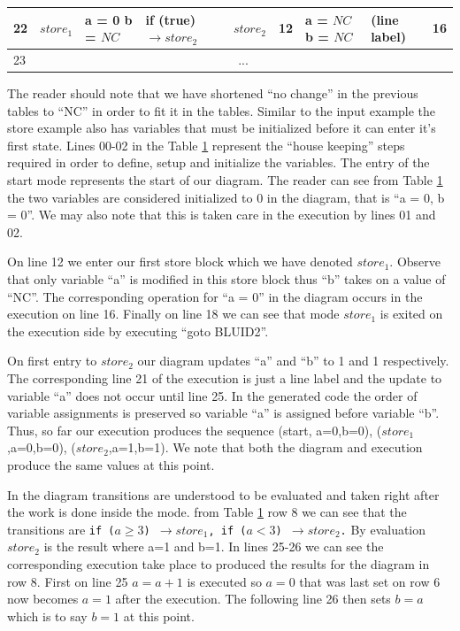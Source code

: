 \begin{table}[htcb]
\begin{tabular}{|p{} | p{} | p{} | p{} | p{} | p{} | p{} | p{} | p{} |}
			\hline
			22&$store_1$			&	a = 0 \newline b = $NC$		&	if (true) $\rightarrow store_2$ & $store_2$			&	12					&	a = $NC$ \newline b = $NC$	&	(line label)				&	16	\\
			\hline
			23&\multicolumn{8}{|c|}{...}\\
			\hline
		\end{tabular}
	\label{table:StoreExecCombined}
\end{table}

The reader should note that we have shortened ``no change'' in the previous tables to ``NC'' in order to fit
it in the tables.  Similar to the input example the store example also has variables that must be initialized 
before it can enter it's first state. Lines 00-02 in the Table \ref{table:StoreExecCombined} represent the 
``house keeping'' steps required in order to define, setup and initialize the variables. The entry of the start
mode represents the start of our diagram. The reader can see from Table \ref{table:StoreExecCombined} the two
variables are considered initialized to 0 in the diagram, that is ``a = 0, b = 0''. We may also note that this
is taken care in the execution by lines 01 and 02.

On line 12 we enter our first store block which we
have denoted $store_1$. Observe that only variable ``a'' is modified in this store block thus ``b'' takes on 
a value of ``NC''. The corresponding operation for ``a = 0'' in the diagram occurs in the execution on line 16.
Finally on line 18 we can see that mode $store_1$ is exited on the execution side by executing ``goto BLUID2''.

On first entry to $store_2$ our diagram updates ``a'' and ``b'' to 1 and 1 respectively. The corresponding line 21 of
the execution is just a line label and the update to variable ``a'' does not occur until line 25. In the generated
code the order of variable assignments is preserved so variable ``a'' is assigned before variable ``b''. Thus, so
far our execution produces the sequence (start, {a=0,b=0}), ($store_1$,{a=0,b=0}), ($store_2$,{a=1,b=1}). We note that
both the diagram and execution produce the same values at this point.

In the diagram transitions are understood to be evaluated and taken right after the work is done inside the mode.
from Table \ref{table:StoreExecCombined} row 8 we can see that the transitions are 
\texttt{if ($a \geq 3$) $\rightarrow store_1$, if ($a < 3$) $\rightarrow store_2$.} 
By evaluation \texttt{$store_2$} is the result where a=1 and b=1. 
In lines 25-26 we can see the corresponding execution take place to
produced the results for the diagram in row 8. 
First on line 25 $a = a + 1$ is executed so $a = 0$ that was last set
on row 6 now becomes $a = 1$ after the execution. 
The following line 26 then sets $b = a$ which is to say $b = 1$ at
this point.

